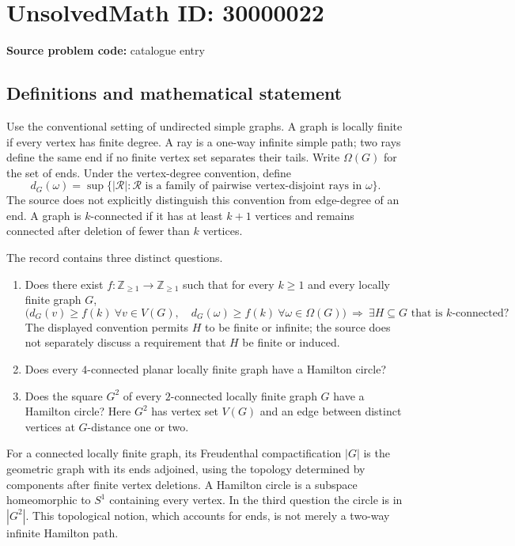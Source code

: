 \documentclass[11pt]{article}
\newcommand{\Z}{\mathbb{Z}}
\begin{document}
\section*{UnsolvedMath ID: 30000022}
\textbf{Source problem code:} catalogue entry
\subsection{Definitions and mathematical statement}
Use the conventional setting of undirected simple graphs. A graph is locally finite if every vertex has finite degree. A ray is a one-way infinite simple path; two rays define the same end if no finite vertex set separates their tails. Write $\Omega(G)$ for the set of ends. Under the vertex-degree convention, define
\[
 d_G(\omega)=\sup\{|\mathcal R|:\mathcal R\text{ is a family of pairwise vertex-disjoint rays in }\omega\}.
\]
The source does not explicitly distinguish this convention from edge-degree of an end. A graph is $k$-connected if it has at least $k+1$ vertices and remains connected after deletion of fewer than $k$ vertices.

The record contains three distinct questions.
\begin{enumerate}
\item Does there exist $f:\Z_{\geq1}\to\Z_{\geq1}$ such that for every $k\geq1$ and every locally finite graph $G$,
\[
 \bigl(d_G(v)\geq f(k)\ \forall v\in V(G),\quad
       d_G(\omega)\geq f(k)\ \forall\omega\in\Omega(G)\bigr)
 \ \Longrightarrow\ 
 \exists H\subseteq G\text{ that is }k\text{-connected}?
\]
The displayed convention permits $H$ to be finite or infinite; the source does not separately discuss a requirement that $H$ be finite or induced.
\item Does every $4$-connected planar locally finite graph have a Hamilton circle?
\item Does the square $G^2$ of every $2$-connected locally finite graph $G$ have a Hamilton circle? Here $G^2$ has vertex set $V(G)$ and an edge between distinct vertices at $G$-distance one or two.
\end{enumerate}
For a connected locally finite graph, its Freudenthal compactification $|G|$ is the geometric graph with its ends adjoined, using the topology determined by components after finite vertex deletions. A Hamilton circle is a subspace homeomorphic to $S^1$ containing every vertex. In the third question the circle is in $|G^2|$. This topological notion, which accounts for ends, is not merely a two-way infinite Hamilton path.
\end{document}
